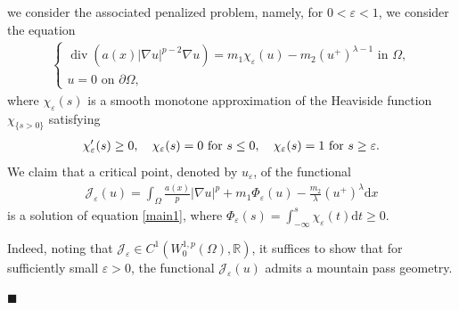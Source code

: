 \documentclass[onecolumn]{autart}
\newenvironment{proof}{{\it Proof: \enspace}}{\hfill $\blacksquare$\par}
\begin{document}
\begin{proof}
	we consider the associated  penalized problem, namely,  for $0 < \varepsilon < 1$, we consider the equation
	\begin{align} \label{main1}
		\begin{cases}
			\operatorname{div}\left( a(x)|\nabla u|^{p-2}\nabla u\right)
			= m_1 \chi_\varepsilon(u) - m_2 (u^{+})^{\lambda-1}
			\text{ in } \Omega, \\
			u = 0  \text{ on } \partial\Omega,
		\end{cases}
	\end{align}
	where $\chi_\varepsilon(s)$ is a smooth monotone approximation of the Heaviside function $\chi_{\{s>0\}}$ satisfying
	\begin{align}
		\chi_\varepsilon'(s) \geq 0, \quad \chi_\varepsilon(s) = 0 \text{ for } s \leq 0, \quad \chi_\varepsilon(s) = 1 \text{ for } s \geq\varepsilon.\notag
	\end{align}
	We claim that    a critical point, denoted by $ u_\varepsilon $, of the functional
	\begin{align}\label{mainb1}
		\mathcal{J}_{\varepsilon}(u) = \int_{\Omega}  \frac{a(x)}{p}|\nabla u|^p
		+ m_1 \Phi_{\varepsilon}(u)  - \frac{m_2}{\lambda}(u^+)^{\lambda}
		\mathrm{d}x
	\end{align}
	is a solution of equation \eqref{main1}, where $\Phi_\varepsilon(s) = \int_{-\infty}^s \chi_\varepsilon(t)\mathrm{d}t \geq 0$.
	
	Indeed, noting  that $\mathcal{J}_\varepsilon \in C^1(W_0^{1,p}(\Omega), \mathbb{R})$, it suffices to show that for sufficiently small $\varepsilon > 0$, the functional $\mathcal{J}_\varepsilon(u)$ admits a mountain pass geometry.
	

\end{proof}
\end{document}
